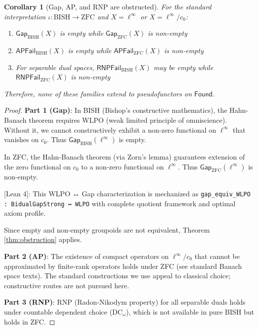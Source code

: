 \documentclass[11pt]{article}
\newtheorem{corollary}[theorem]{Corollary}
\theoremstyle{definition}
\theoremstyle{remark}
\newcommand{\status}[1]{\textsf{\small\color{blue!60!black}[#1]}}
\newcommand{\cnull}{c_0}
\newcommand{\linf}{\ell^\infty}
\newcommand{\Found}{\mathsf{Found}}
\begin{document}
\begin{corollary}[Gap, AP, and RNP are obstructed]\label{cor:gap-ap-rnp-obstructed}
For the standard interpretation \(\iota: \text{BISH} \to \text{ZFC}\) and \(X = \linf\) or \(X = \linf/\cnull\):
\begin{enumerate}
\item \(\mathsf{Gap}_{\text{BISH}}(X)\) is empty while \(\mathsf{Gap}_{\text{ZFC}}(X)\) is non-empty
\item \(\mathsf{AP\!Fail}_{\text{BISH}}(X)\) is empty while \(\mathsf{AP\!Fail}_{\text{ZFC}}(X)\) is non-empty
\item For separable dual spaces, \(\mathsf{RNP\!Fail}_{\text{BISH}}(X)\) may be empty while \(\mathsf{RNP\!Fail}_{\text{ZFC}}(X)\) is non-empty
\end{enumerate}
Therefore, none of these families extend to pseudofunctors on \(\Found\).
\end{corollary}

\begin{proof}
\textbf{Part 1 (Gap)}: In BISH (Bishop's constructive mathematics), the Hahn-Banach theorem requires WLPO (weak limited principle of omniscience). Without it, we cannot constructively exhibit a non-zero functional on \(\linf\) that vanishes on \(\cnull\). Thus \(\mathsf{Gap}_{\text{BISH}}(\linf)\) is empty.

In ZFC, the Hahn-Banach theorem (via Zorn's lemma) guarantees extension of the zero functional on \(\cnull\) to a non-zero functional on \(\linf\). Thus \(\mathsf{Gap}_{\text{ZFC}}(\linf)\) is non-empty.

\status{Lean 4}: This WLPO ↔ Gap characterization is mechanized as \texttt{gap\_equiv\_WLPO : BidualGapStrong ↔ WLPO} with complete quotient framework and optimal axiom profile.

Since empty and non-empty groupoids are not equivalent, Theorem \ref{thm:obstruction} applies.

\textbf{Part 2 (AP)}: The existence of compact operators on \(\linf/\cnull\) that cannot be approximated by finite-rank operators holds under ZFC (see standard Banach space texts). The standard constructions we use appeal to classical choice; constructive routes are not pursued here.

\textbf{Part 3 (RNP)}: RNP (Radon-Nikodym property) for all separable duals holds under countable dependent choice (DC\(_\omega\)), which is not available in pure BISH but holds in ZFC.
\end{proof}
\end{document}

